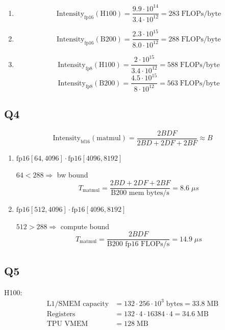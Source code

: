 \documentclass[11pt]{article}
\begin{document}
\begin{enumerate}[label=(\roman*)]
    \item \[
    \text{Intensity}_{\text{fp16}}(\text{H100}) = \frac{9.9 \cdot 10^{14}}{3.4 \cdot 10^{12}} = 283 \;\text{FLOPs/byte}
    \]

    \item \[
    \text{Intensity}_{\text{fp16}}(\text{B200}) = \frac{2.3 \cdot 10^{15}}{8.0 \cdot 10^{12}} = 288 \;\text{FLOPs/byte}
    \]

    \item \[
    \text{Intensity}_{\text{fp8}}(\text{H100}) = \frac{2 \cdot 10^{15}}{3.4 \cdot 10^{12}} = 588 \;\text{FLOPs/byte}
    \]
    \[
    \text{Intensity}_{\text{fp8}}(\text{B200}) = \frac{4.5 \cdot 10^{15}}{8 \cdot 10^{12}} = 563 \;\text{FLOPs/byte}
    \]
\end{enumerate}

\subsection*{Q4}

\[
\text{Intensity}_{\text{bf16}}(\text{matmul}) = \frac{2BDF}{2BD + 2DF + 2BF} \approx B
\]



\begin{enumerate}[label=(\roman*)]
    \item $\text{fp16}[64, 4096] \cdot \text{fp16}[4096, 8192]$

    $64 < 288 \Rightarrow$ bw bound
    \[
    T_{\text{matmul}} = \frac{2BD + 2DF + 2BF}{\text{B200 mem bytes/s}} = 8.6 \;\mu s
    \]

    \item $\text{fp16}[512, 4096] \cdot \text{fp16}[4096, 8192]$

    $512 > 288 \Rightarrow$ compute bound
    \[
    T_{\text{matmul}} = \frac{2BDF}{\text{B200 fp16 FLOPs/s}} = 14.9 \;\mu s
    \]
\end{enumerate}

\subsection*{Q5}

H100:
\begin{align*}
\text{L1/SMEM capacity} &= 132 \cdot 256 \cdot 10^3 \;\text{bytes} = 33.8 \;\text{MB} \\
\text{Registers} &= 132 \cdot 4 \cdot 16384 \cdot 4 = 34.6 \;\text{MB} \\
\text{TPU VMEM} &= 128 \;\text{MB}
\end{align*}
\end{document}

